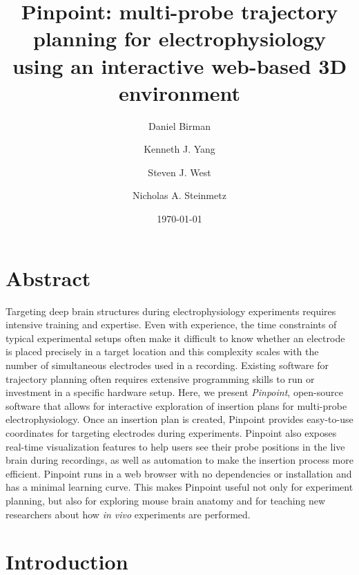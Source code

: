 \documentclass{article}
\title{Pinpoint: multi-probe trajectory planning for electrophysiology using an interactive web-based 3D environment}
\author[1,2,*]{Daniel Birman}
\author[1]{Kenneth J. Yang}
\author[2]{Steven J. West}
\author[1,2]{Nicholas A. Steinmetz}
\affil[1]{Department of Biological Structure, University of Washington, Seattle, WA 98195, USA}
\affil[2]{International Brain Laboratory: internationalbrainlab.org}
\affil[*]{Corresponding author: dbirman@uw.edu}
\date{\today}
\begin{document}
\maketitle

\section{Abstract}
Targeting deep brain structures during electrophysiology experiments requires intensive training and expertise. Even with experience, the time constraints of typical experimental setups often make it difficult to know whether an electrode is placed precisely in a target location and this complexity scales with the number of simultaneous electrodes used in a recording. Existing software for trajectory planning often requires extensive programming skills to run or investment in a specific hardware setup. Here, we present \textit{Pinpoint}, open-source software that allows for interactive exploration of insertion plans for multi-probe electrophysiology. Once an insertion plan is created, Pinpoint provides easy-to-use coordinates for targeting electrodes during experiments. Pinpoint also exposes real-time visualization features to help users see their probe positions in the live brain during recordings, as well as automation to make the insertion process more efficient. Pinpoint runs in a web browser with no dependencies or installation and has a minimal learning curve. This makes Pinpoint useful not only for experiment planning, but also for exploring mouse brain anatomy and for teaching new researchers about how \textit{in vivo} experiments are performed. 

\clearpage

\linenumbers

\section{Introduction}

\end{document}
